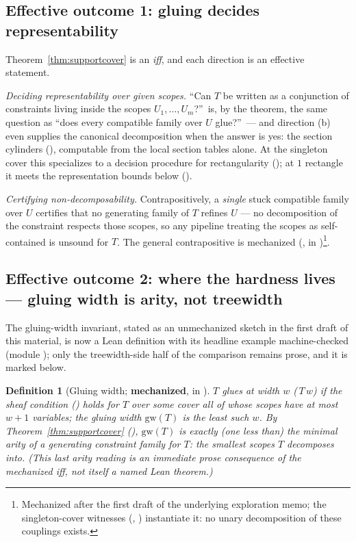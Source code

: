 \documentclass[11pt]{article}
\newtheorem{definition}{Definition}
\begin{document}
\subsection{Effective outcome 1: gluing decides representability}
\label{sec:decide}

Theorem~\ref{thm:supportcover} is an \emph{iff}, and each direction
is an effective statement.

\emph{Deciding representability over given scopes.}  ``Can $T$ be
written as a conjunction of constraints living inside the scopes
$U_1, \dots, U_m$?''\ is, by the theorem, the same question as ``does
every compatible family over $U$ glue?''\ --- and direction (b) even
supplies the canonical decomposition when the answer is yes: the
section cylinders (), computable from the local
section tables alone.  At the singleton cover this specializes to a
decision procedure for rectangularity
(); at $1$ rectangle it meets the
representation bounds below
().

\emph{Certifying non-decomposability.}  Contrapositively, a
\emph{single} stuck compatible family over $U$ certifies that no
generating family of $T$ refines $U$ --- no decomposition of the
constraint respects those scopes, so any pipeline treating the scopes
as self-contained is unsound for $T$.  The general contrapositive is
mechanized
(, in
)\footnote{Mechanized after the first draft of
the underlying exploration memo; the singleton-cover witnesses
(,
) instantiate it: no unary
decomposition of these couplings exists.}.

\subsection{Effective outcome 2: where the hardness lives ---
gluing width is arity, not treewidth}
\label{sec:width}

The gluing-width invariant, stated as an unmechanized sketch in the
first draft of this material, is now a Lean definition with its
headline example machine-checked (module );
only the treewidth-side half of the comparison remains prose, and it
is marked below.

\begin{definition}[Gluing width; \textbf{mechanized},
 in ]
\label{def:gluingwidth}
$T$ \emph{glues at width $w$} ($\,T\,w$) if the
sheaf condition () holds for $T$ over some
cover all of whose scopes have at most $w+1$ variables; the gluing
width $\mathrm{gw}(T)$ is the least such $w$.  By
Theorem~\ref{thm:supportcover}
(),
$\mathrm{gw}(T)$ is exactly (one less than) the minimal \emph{arity}
of a generating constraint family for $T$: the smallest scopes $T$
decomposes into.  (This last arity reading is an immediate prose
consequence of the mechanized iff, not itself a named Lean theorem.)
\end{definition}
\end{document}
